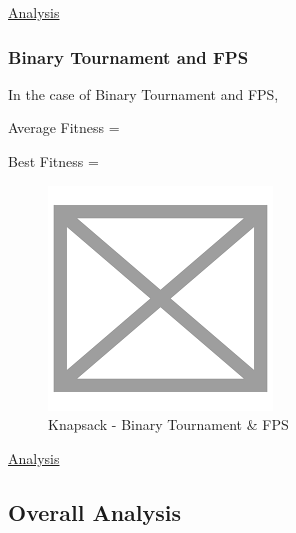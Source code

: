 \documentclass[11pt, letterpaper]{article}
\begin{document}
\underline{Analysis}
\subsubsection {Binary Tournament and FPS}
In the case of Binary Tournament and FPS,

Average Fitness = 

Best Fitness = 
\begin{figure}[H]
    \centering
    \includegraphics[scale = 0.6]{images/placeHolder.png}
    \caption {Knapsack - Binary Tournament \& FPS}
    \label {fig:gcBF}
\end{figure}

\underline{Analysis}
\subsection {Overall Analysis}
\end{document}
